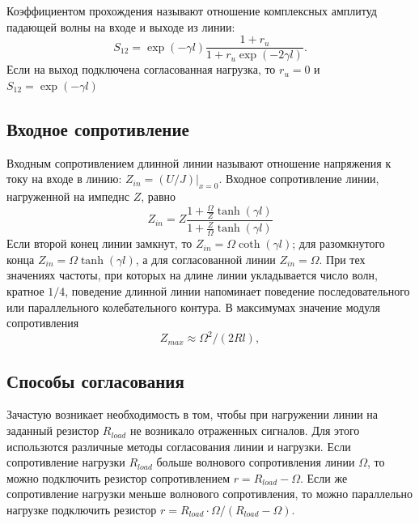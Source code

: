 \documentclass[a4paper,14pt]{extarticle}
\begin{document}
		 	Коэффициентом прохождения называют отношение комплексных амплитуд падающей волны на входе и выходе из линии:
		 	\begin{equation}
		 		S_{1 2} = \exp(-\gamma l) \frac{1 + r_u}{1 + r_u \exp{(-2 \gamma l)}}.
		 	\end{equation}
		 	Если на выход подключена согласованная нагрузка, то $r_u = 0$ и $S_{1 2} = \exp{(-\gamma l)}$
		 \subsection{Входное сопротивление}
		 Входным сопротивлением длинной линии называют отношение напряжения к току на входе в линию: $Z_{in} = \left. (U/J)\right|_{x = 0}$. Входное сопротивление линии, нагруженной на импеднс $Z$, равно
		 \begin{equation}
		 	Z_{in} = Z \frac{1 + \frac{\Omega}{Z} \tanh(\gamma l)}{1 + \frac{Z}{\Omega} \tanh(\gamma l)}
		 \end{equation}
		 Если второй конец линии замкнут, то $Z_{in} = \Omega \coth(\gamma l)$; для разомкнутого конца $Z_{in} = \Omega \tanh(\gamma l)$, а для согласованной линии $Z_{in} = \Omega$. При тех значениях частоты, при которых на длине линии укладывается число волн, кратное $1/4$, поведение длинной линии напоминает поведение последовательного или параллельного колебательного контура. В максимумах значение модуля сопротивления
		 \begin{equation}
		 	Z_{max} \approx \Omega^2 /(2 R l), 
		 \end{equation}
	\subsection{Способы согласования}
		Зачастую возникает необходимость в том, чтобы при нагружении линии на заданный резистор $R_{load}$ не возникало отраженных сигналов. Для этого использются различные методы согласования линии и нагрузки. Если сопротивление нагрузки $R_{load}$ больше волнового сопротивления линии $\Omega$, то можно подключить резистор сопротивлением $r = R_{load} - \Omega$. Если же сопротивление нагрузки меньше волнового сопротивления, то можно параллельно нагрузке подключить резистор $r = R_{load} \cdot \Omega / (R_{load} - \Omega)$.
\end{document}
